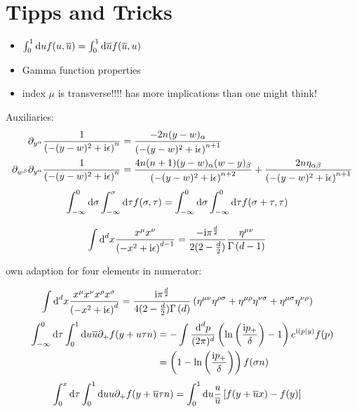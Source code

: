 \ifdefined\mainprogram{}
\else

\fi

\section{Tipps and Tricks}
\begin{itemize}
	\item $\int _0^1 \text{d} u  f(u,\overline u) = \int _0^1 \text{d} \overline u  f(\overline u, u)$
	\item Gamma function properties
	\item index $\mu$ is transverse!!!! has more implications than one might think!
\end{itemize}


Auxiliaries: 
\begin{align}
	\partial_{y^\alpha} \frac{1}{ \left(-(y-w)^2+\text{i}\epsilon\right)^{n}}
	&=
	\frac{-2n(y-w)_\alpha}{ \left(-(y-w)^2+\text{i}\epsilon\right)^{n+1}}
	\\
	\partial_{w^\beta}\partial_{y^\alpha} \frac{1}{ \left(-(y-w)^2+\text{i}\epsilon\right)^{n}}
	&=
	\frac{4n(n+1)(y-w)_\alpha(w-y)_\beta}{ \left(-(y-w)^2+\text{i}\epsilon\right)^{n+2}}+\frac{2n\eta_{\alpha\beta}}{ \left(-(y-w)^2+\text{i}\epsilon\right)^{n+1}}
\end{align}
\begin{align}
	\int_{-\infty}^0 \text{d} \sigma \int _{-\infty}^\sigma \text{d} \tau f(\sigma, \tau)&=\int_{-\infty}^0 \text{d} \sigma \int _{-\infty}^0 \text{d} \tau f(\sigma + \tau, \tau) 
\end{align}

\begin{align}
	\int \text{d} ^d x \frac{x^\mu x^\nu}{\left(-x^2+\text{i} \epsilon\right)^{d-1}}
	&=
	\frac{-\text{i} \pi^{\frac{d}{2}}}{2(2-\frac{d}{2})}\frac{\eta^{\mu\nu}}{\Gamma\left(d-1\right)}
\end{align}

own adaption for four elements in numerator:

\begin{align}
	\int \text{d} ^d  x \frac{x^\mu x^\nu x^\rho x^\sigma}{\left(-x^2+\text{i} \epsilon\right)^{d}}
	&=
	\frac{\text{i} \pi^{\frac{d}{2}}}{4(2-\frac{d}{2})\Gamma\left(d\right)}\left(\eta^{\mu\nu}\eta^{\rho \sigma} + \eta^{\mu \rho} \eta^{\nu \sigma} +\eta^{\mu \sigma}\eta^{\nu \rho}\right)	
\end{align}
\begin{align}
\int_{-\infty}^{0} \text{d} \tau \int_0^1 \text{d} u \overline u \partial_+f(y+  u \tau n)
&=
-\int \frac{\text{d} ^d p}{(2\pi)^d}\left( \ln\left(\frac{\text{i} p_{+}}{\delta}\right) -1\right) e^{\text{i} (p|y)}f(p)
\\
&=
\left(1-\ln\left(\frac{\text{i} p_{+}}{\delta}\right)\right)f(\sigma n)
\end{align}
\begin{align}
	\int ^x_0 \text{d} \tau \int _0^1\text{d} u u \partial_+ f(y+\overline u \tau n) &=  \int_0^1 \text{d} u \frac{u}{\overline u} \left[f(y+\overline u x) - f(y)\right]
\end{align}





\ifdefined\mainprogram{}
\else

\fi